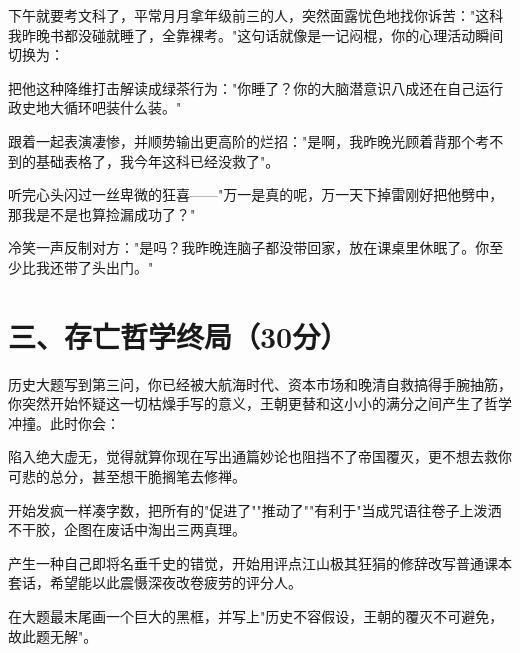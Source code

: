 \documentclass{exam-zh}
\begin{document}
\begin{question}[points = 5]
  下午就要考文科了，平常月月拿年级前三的人，突然面露忧色地找你诉苦："这科我昨晚书都没碰就睡了，全靠裸考。"这句话就像是一记闷棍，你的心理活动瞬间切换为：
  \begin{choices}
    \item 把他这种降维打击解读成绿茶行为："你睡了？你的大脑潜意识八成还在自己运行政史地大循环吧装什么装。"
    \item 跟着一起表演凄惨，并顺势输出更高阶的烂招："是啊，我昨晚光顾着背那个考不到的基础表格了，我今年这科已经没救了"。
    \item 听完心头闪过一丝卑微的狂喜——"万一是真的呢，万一天下掉雷刚好把他劈中，那我是不是也算捡漏成功了？"
    \item 冷笑一声反制对方："是吗？我昨晚连脑子都没带回家，放在课桌里休眠了。你至少比我还带了头出门。"
  \end{choices}
\end{question}

\section{三、存亡哲学终局（30分）}

\begin{question}[points = 5]
  历史大题写到第三问，你已经被大航海时代、资本市场和晚清自救搞得手腕抽筋，你突然开始怀疑这一切枯燥手写的意义，王朝更替和这小小的满分之间产生了哲学冲撞。此时你会：
  \begin{choices}
    \item 陷入绝大虚无，觉得就算你现在写出通篇妙论也阻挡不了帝国覆灭，更不想去救你可悲的总分，甚至想干脆搁笔去修禅。
    \item 开始发疯一样凑字数，把所有的"促进了""推动了""有利于"当成咒语往卷子上泼洒不干胶，企图在废话中淘出三两真理。
    \item 产生一种自己即将名垂千史的错觉，开始用评点江山极其狂狷的修辞改写普通课本套话，希望能以此震慑深夜改卷疲劳的评分人。
    \item 在大题最末尾画一个巨大的黑框，并写上"历史不容假设，王朝的覆灭不可避免，故此题无解"。
  \end{choices}
\end{question}
\end{document}
